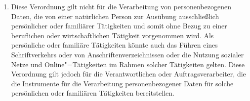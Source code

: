 \begin{enumerate}

   \item Diese Verordnung gilt nicht für die Verarbeitung von personenbezogenen Daten, die von einer natürlichen Person
    zur Ausübung ausschließlich persönlicher oder familiärer Tätigkeiten und somit ohne Bezug zu einer beruflichen oder
    wirtschaftlichen Tätigkeit vorgenommen wird. Als persönliche oder familiäre Tätigkeiten könnte auch das Führen
    eines Schriftverkehrs oder von Anschriftenverzeichnissen oder die Nutzung sozialer Netze und Online"=Tätigkeiten im
    Rahmen solcher Tätigkeiten gelten. Diese Verordnung gilt jedoch für die Verantwortlichen oder Auftragsverarbeiter,
    die die Instrumente für die Verarbeitung personenbezogener Daten für solche persönlichen oder familiären
    Tätigkeiten bereitstellen.%
   \label{itm:eg-18}
   


\end{enumerate}
